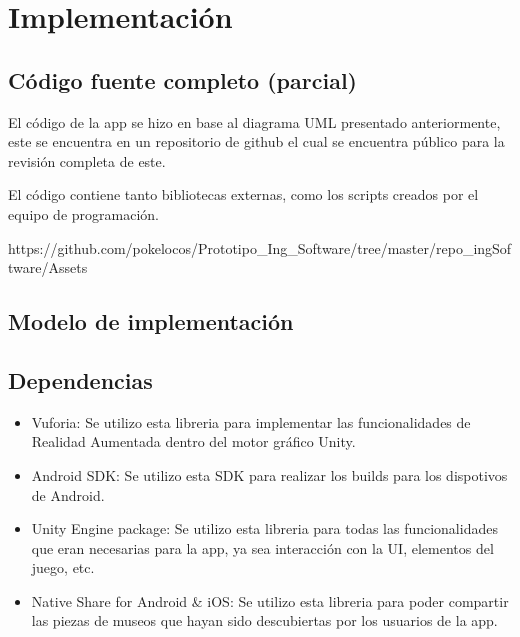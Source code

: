 \section{Implementación}
\subsection{Código fuente completo (parcial)}
El código de la app se hizo en base al diagrama UML presentado anteriormente, este se encuentra en un repositorio de github el cual se encuentra público para la revisión completa de este.

El código contiene tanto bibliotecas externas, como los scripts creados por el equipo de programación. 

https://github.com/pokelocos/Prototipo_Ing_Software/tree/master/repo_ingSoftware/Assets


\subsection{Modelo de implementación}

\subsection{Dependencias}

\begin{itemize}

\item Vuforia: Se utilizo esta libreria para implementar las funcionalidades de Realidad Aumentada dentro del motor gráfico Unity.

\item Android SDK: Se utilizo esta SDK para realizar los builds para los dispotivos de Android.

\item Unity Engine package: Se utilizo esta libreria para todas las funcionalidades que eran necesarias para la app, ya sea interacción con la UI, elementos del juego, etc.

\item Native Share for Android & iOS: Se utilizo esta libreria para poder compartir las piezas de museos que hayan sido descubiertas por los usuarios de la app.


\end{itemize}